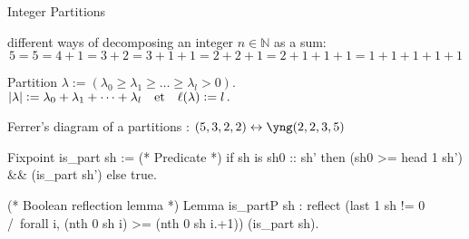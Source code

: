 \documentclass[compress,11pt]{beamer}
\newcommand{\XX}{{\mathbb X}}
\newcommand{\N}{{\mathbb N}}
\newcommand{\qandq}{\text{\quad et\quad}}
\renewcommand{\emph}[1]{{\color{red} #1}}
\begin{document}
\begin{frame}[fragile]{Integer Partitions}

  different ways of decomposing an integer $n\in\N$ as a sum:
  \[ 5=5=4+1=3+2=3+1+1=2+2+1=2+1+1+1=1+1+1+1+1 \]

  Partition $\lambda := (\lambda_0\geq\lambda_1\geq\dots\geq\lambda_l > 0)$.\\
  $|\lambda| := \lambda_0+\lambda_1+\dots+\lambda_l \qandq
  \ell(\lambda) := l\,. $

  Ferrer's diagram of a partitions : $(5,3,2,2) \leftrightarrow \yng(2,2,3,5)$



\begin{coqcode}
  Fixpoint is_part sh := (* Predicate *)
    if sh is sh0 :: sh'
    then (sh0 >= head 1 sh') && (is_part sh')
    else true.

  (* Boolean reflection lemma *)
  Lemma is_partP sh : reflect
    (last 1 sh != 0 /\ forall i, (nth 0 sh i) >= (nth 0 sh i.+1))
    (is_part sh).
\end{coqcode}

\end{frame}




\end{document}
